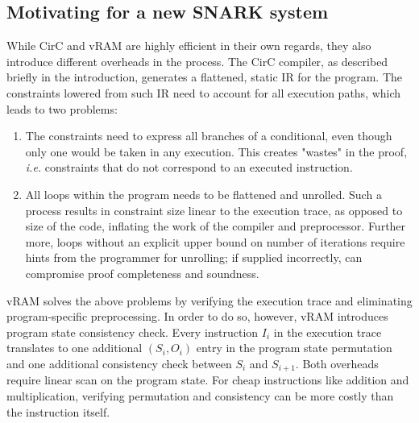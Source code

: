 \subsection{Motivating for a new SNARK system}
While CirC and vRAM are highly efficient in their own regards, they also introduce different overheads in the process. The CirC compiler, as described briefly in the introduction, generates a flattened, static IR for the program. The constraints lowered from such IR need to account for all execution paths, which leads to two problems:
\begin{enumerate}
    \item The constraints need to express all branches of a conditional, even though only one would be taken in any execution. This creates "wastes" in the proof, \emph{i.e.} constraints that do not correspond to an executed instruction.
    \item All loops within the program needs to be flattened and unrolled. Such a process results in constraint size linear to the execution trace, as opposed to size of the code, inflating the work of the compiler and preprocessor. Further more, loops without an explicit upper bound on number of iterations require hints from the programmer for unrolling; if supplied incorrectly, can compromise proof completeness and soundness. 
\end{enumerate}

vRAM solves the above problems by verifying the execution trace and eliminating program-specific preprocessing. In order to do so, however, vRAM introduces program state consistency check. Every instruction $I_i$ in the execution trace translates to one additional $(S_i, O_i)$ entry in the program state permutation and one additional consistency check between $S_i$ and $S_{i+1}$. Both overheads require linear scan on the program state. For cheap instructions like addition and multiplication, verifying permutation and consistency can be more costly than the instruction itself.

